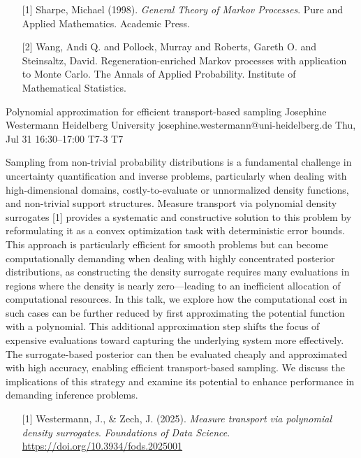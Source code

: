 \begin{talk}
\medskip

\begin{enumerate}
	\item[{[1]}] Sharpe, Michael (1998). {\it General Theory of Markov Processes}. Pure and Applied Mathematics. Academic Press.
	\item[{[2]}] Wang, Andi Q. and Pollock, Murray and Roberts, Gareth O. and Steinsaltz, David. Regeneration-enriched Markov processes with application to Monte Carlo. The Annals of Applied Probability. Institute of Mathematical Statistics.
\end{enumerate}

\end{talk}

\begin{talk}
  {Polynomial approximation for efficient transport-based sampling}%
  {Josephine Westermann}%
  {Heidelberg University}%
  {josephine.westermann@uni-heidelberg.de}%
  {}%
  {}%
  {Thu, Jul 31 16:30–17:00}%
  {T7-3}%
  {T7}%
  {}%
  {}

Sampling from non-trivial probability distributions is a fundamental challenge in uncertainty quantification and inverse problems, particularly when dealing with high-dimensional domains, costly-to-evaluate or unnormalized density functions, and non-trivial support structures. Measure transport via polynomial density surrogates [1] provides a systematic and constructive solution to this problem by reformulating it as a convex optimization task with deterministic error bounds. This approach is particularly efficient for smooth problems but can become computationally demanding when dealing with highly concentrated posterior distributions, as constructing the density surrogate requires many evaluations in regions where the density is nearly zero—leading to an inefficient allocation of computational resources. In this talk, we explore how the computational cost in such cases can be further reduced by first approximating the potential function with a polynomial. This additional approximation step shifts the focus of expensive evaluations toward capturing the underlying system more effectively. The surrogate-based posterior can then be evaluated cheaply and approximated with high accuracy, enabling efficient transport-based sampling. We discuss the implications of this strategy and examine its potential to enhance performance in demanding inference problems.

\medskip

\begin{enumerate}
	\item[{[1]}] Westermann, J., \& Zech, J. (2025). \textit{Measure transport via polynomial density surrogates}. \textit{Foundations of Data Science}. \url{https://doi.org/10.3934/fods.2025001}
\end{enumerate}

\end{talk}

